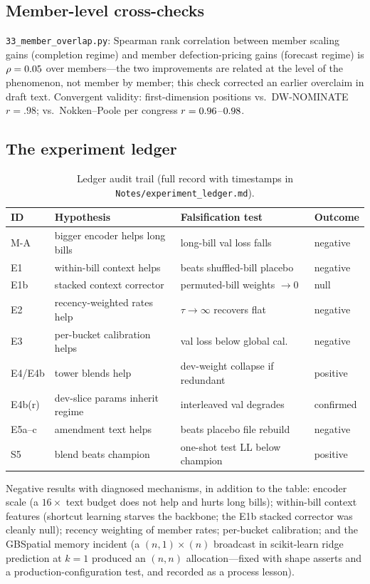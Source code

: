 \documentclass[11pt]{article}
\newcommand{\code}[1]{\texttt{#1}}
\begin{document}
\subsection{Member-level cross-checks}

\code{33\_member\_overlap.py}: Spearman rank correlation between member
scaling gains (completion regime) and member defection-pricing gains
(forecast regime) is $\rho = 0.05$ over \overlapN{}
members---the two improvements are related at the level of the
phenomenon, not member by member; this check corrected an earlier
overclaim in draft text. Convergent validity: first-dimension positions
vs.\ DW-NOMINATE $r=.98$; vs.\ Nokken--Poole per congress
$r = 0.96$--$0.98$.

\subsection{The experiment ledger}

\begin{table}[tbp]
\centering
\caption{Ledger audit trail (full record with timestamps in
\code{Notes/experiment\_ledger.md}).}
\label{tab:ledger}
{\small
\begin{tabular}{llll}
\toprule
ID & Hypothesis & Falsification test & Outcome \\
\midrule
M-A & bigger encoder helps long bills & long-bill val loss falls & negative \\
E1 & within-bill context helps & beats shuffled-bill placebo & negative \\
E1b & stacked context corrector & permuted-bill weights $\to 0$ & null \\
E2 & recency-weighted rates help & $\tau\to\infty$ recovers flat & negative \\
E3 & per-bucket calibration helps & val loss below global cal. & negative \\
E4/E4b & tower blends help & dev-weight collapse if redundant & positive \\
E4b(r) & dev-slice params inherit regime & interleaved val degrades & confirmed \\
E5a--c & amendment text helps & beats placebo file rebuild & negative \\
S5 & blend beats champion & one-shot test LL below champion & positive \\
\bottomrule
\end{tabular}}
\end{table}

Negative results with diagnosed mechanisms, in addition to the table:
encoder scale (a $16\times$ text budget does not help and hurts long
bills); within-bill context features (shortcut learning starves the
backbone; the E1b stacked corrector was cleanly null); recency weighting
of member rates; per-bucket calibration; and the GBSpatial memory
incident (a $(n,1)\times(n)$ broadcast in scikit-learn ridge prediction
at $k=1$ produced an $(n,n)$ allocation---fixed with shape asserts and a
production-configuration test, and recorded as a process lesson).
\end{document}
